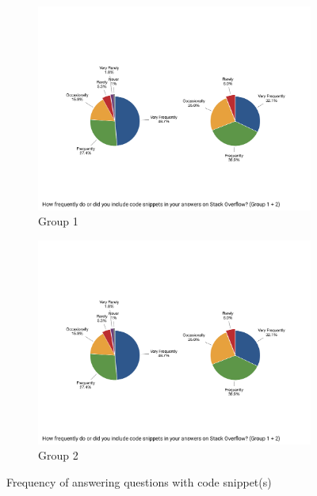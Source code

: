 \documentclass{svjour3}                     %
\begin{document}
\begin{figure}
	\begin{subfigure}{.5\textwidth}
		\centering
		\includegraphics[width=\linewidth]{survey_answer_frequency_with_code_1}
		\caption{Group 1}
		\label{fig:survey_answer_frequency_with_code_1}
	\end{subfigure}%
	\begin{subfigure}{.5\textwidth}
		\centering
		\includegraphics[width=0.9\linewidth]{survey_answer_frequency_with_code_2}
		\caption{Group 2}
		\label{fig:survey_answer_frequency_with_code_2}
	\end{subfigure}
	\caption{Frequency of answering questions with code snippet(s)}
	\label{fig:survey_answer_frequency_with_code}
\end{figure}
\end{document}
